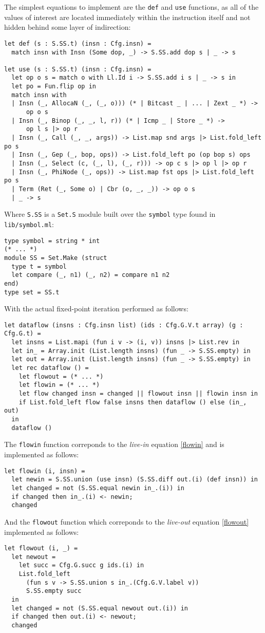 \documentclass{article}
\begin{document}
The simplest equations to implement are the \lstinline!def! and \lstinline!use! functions, as all of the values of interest are located immediately within the instruction itself and not hidden behind some layer of indirection:
\begin{verbatim}
let def (s : S.SS.t) (insn : Cfg.insn) =
  match insn with Insn (Some dop, _) -> S.SS.add dop s | _ -> s

let use (s : S.SS.t) (insn : Cfg.insn) =
  let op o s = match o with Ll.Id i -> S.SS.add i s | _ -> s in
  let po = Fun.flip op in
  match insn with
  | Insn (_, AllocaN (_, (_, o))) (* | Bitcast _ | ... | Zext _ *) ->
      op o s
  | Insn (_, Binop (_, _, l, r)) (* | Icmp _ | Store _ *) ->
      op l s |> op r
  | Insn (_, Call (_, _, args)) -> List.map snd args |> List.fold_left po s
  | Insn (_, Gep (_, bop, ops)) -> List.fold_left po (op bop s) ops
  | Insn (_, Select (c, (_, l), (_, r))) -> op c s |> op l |> op r
  | Insn (_, PhiNode (_, ops)) -> List.map fst ops |> List.fold_left po s
  | Term (Ret (_, Some o) | Cbr (o, _, _)) -> op o s
  | _ -> s
\end{verbatim}
Where \lstinline!S.SS! is a \lstinline!Set.S! module built over the \lstinline!symbol! type found in \lstinline!lib/symbol.ml!:
\begin{verbatim}
type symbol = string * int
(* ... *)
module SS = Set.Make (struct
  type t = symbol
  let compare (_, n1) (_, n2) = compare n1 n2
end)
type set = SS.t
\end{verbatim}
With the actual fixed-point iteration performed as follows:
\begin{verbatim}
let dataflow (insns : Cfg.insn list) (ids : Cfg.G.V.t array) (g : Cfg.G.t) =
  let insns = List.mapi (fun i v -> (i, v)) insns |> List.rev in
  let in_ = Array.init (List.length insns) (fun _ -> S.SS.empty) in
  let out = Array.init (List.length insns) (fun _ -> S.SS.empty) in
  let rec dataflow () =
    let flowout = (* ... *)
    let flowin = (* ... *)
    let flow changed insn = changed || flowout insn || flowin insn in
    if List.fold_left flow false insns then dataflow () else (in_, out)
  in
  dataflow ()
\end{verbatim}
The \texttt{flowin} function correponds to the \textit{live-in} equation \eqref{flowin} and is implemented as follows:
\begin{verbatim}
let flowin (i, insn) =
  let newin = S.SS.union (use insn) (S.SS.diff out.(i) (def insn)) in
  let changed = not (S.SS.equal newin in_.(i)) in
  if changed then in_.(i) <- newin;
  changed
\end{verbatim}
And the \texttt{flowout} function which correponds to the \textit{live-out} equation \eqref{flowout} implemented as follows:
\begin{verbatim}
let flowout (i, _) =
  let newout =
    let succ = Cfg.G.succ g ids.(i) in
    List.fold_left
      (fun s v -> S.SS.union s in_.(Cfg.G.V.label v))
      S.SS.empty succ
  in
  let changed = not (S.SS.equal newout out.(i)) in
  if changed then out.(i) <- newout;
  changed
\end{verbatim}
\end{document}
